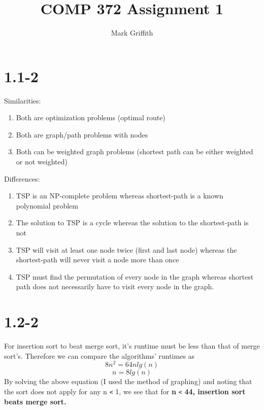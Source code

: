 \documentclass{article}
\begin{document}
\title{COMP 372 Assignment 1}
\author{Mark Griffith}

\maketitle


\section{1.1-2}
Similarities:
\begin{enumerate}
  \item	Both are optimization problems (optimal route)
  \item Both are graph/path problems with nodes
  \item Both can be weighted graph problems (shortest path can be either weighted
  or not weighted)
\end{enumerate}
Differences:
\begin{enumerate}
  \item TSP is an NP-complete problem whereas shortest-path is a known polynomial problem
  \item The solution to TSP is a cycle whereas the solution to the shortest-path is not
  \item TSP will visit at least one node twice (first and last node) whereas the shortest-path will never visit a node more than once
  \item TSP must find the permutation of every node in the graph whereas shortest
  path does not necessarily have to visit every node in the graph.
\end{enumerate}

\section{1.2-2}
For insertion sort to beat merge sort, it’s runtime must be less than that of merge sort’s. Therefore we can compare the algorithms’ runtimes as
\begin{equation*}
  \label{simple_equation}
    8n^2 = 64nlg(n)
\end{equation*}
\begin{equation*}
  \label{simple_equation}
    n = 8lg(n)
\end{equation*}
By solving the above equation (I used the method of graphing) and noting that the sort does not
apply for any n \verb|<| 1, we see that for \textbf{n} \verb|<|  \textbf{44, insertion sort beats merge sort.}
\end{document}
